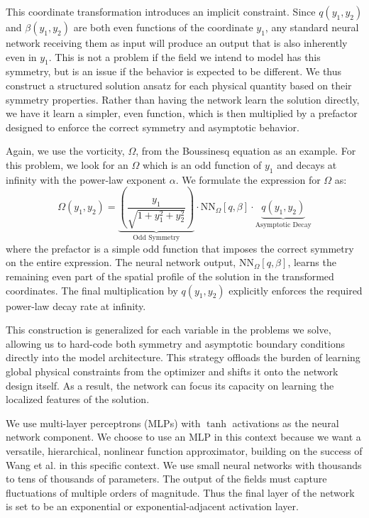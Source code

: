 \documentclass[fleqn,11pt]{wlscirep}
\begin{document}
This coordinate transformation introduces an implicit constraint. Since $q(y_1, y_2)$ and $\beta(y_1, y_2)$ are both even functions of the coordinate $y_1$, any standard neural network receiving them as input will produce an output that is also inherently even in $y_1$. This is not a problem if the field we intend to model has this symmetry, but is an issue if the behavior is expected to be different. We thus construct a structured solution ansatz for each physical quantity based on their symmetry properties. Rather than having the network learn the solution directly, we have it learn a simpler, even function, which is then multiplied by a prefactor designed to enforce the correct symmetry and asymptotic behavior.

Again, we use the vorticity, $\Omega$, from the Boussinesq equation as an example. For this problem, we look for an $\Omega$ which is an odd function of $y_1$ and decays at infinity with the power-law exponent $\alpha$. We formulate the expression for $\Omega$ as:
\begin{equation} \label{eq:ansatz_vorticity}
    \Omega(y_1, y_2) = \underbrace{ \left( \frac{y_1}{\sqrt{1+y_1^2+y_2^2}} \right) }_{\text{Odd Symmetry}} \cdot  \mathrm{NN}_{\Omega}[q, \beta]  \cdot \underbrace{ q(y_1, y_2) }_{\text{Asymptotic Decay}}
\end{equation}
where the prefactor is a simple odd function that imposes the correct symmetry on the entire expression. The neural network output, $\mathrm{NN}_{\Omega}[q, \beta]$, learns the remaining even part of the spatial profile of the solution in the transformed coordinates. The final multiplication by \textbf{$q(y_1, y_2)$} explicitly enforces the required power-law decay rate at infinity.

This construction is generalized for each variable in the problems we solve, allowing us to hard-code both symmetry and asymptotic boundary conditions directly into the model architecture. This strategy offloads the burden of learning global physical constraints from the optimizer and shifts it onto the network design itself. As a result, the network can focus its capacity on learning the localized features of the solution.

We use multi-layer perceptrons (MLPs) with $\tanh$ activations as the neural network component. We choose to use an MLP in this context because we want a versatile, hierarchical, nonlinear function approximator, building on the success of Wang et al. \cite{Wang-Lai-GomezSerrano-Buckmaster:pinn-selfsimilar-boussinesq} in this specific context.  We use small neural networks with thousands to tens of thousands of parameters. The output of the fields must capture fluctuations of multiple orders of magnitude. Thus the final layer of the network is set to be an exponential or exponential-adjacent activation layer.
\end{document}
